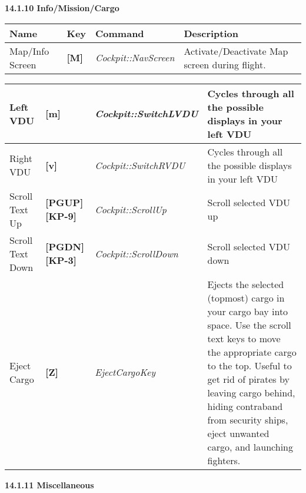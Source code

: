 \documentclass{article}
\begin{document}
\textbf{}

\textbf{}

\textbf{}

\textbf{}

\textbf{}

\textbf{}

\textbf{14.1.10 Info/Mission/Cargo }

\begin{tabular}{|p{0.8in}|p{0.4in}|p{1.1in}|p{2.5in}|} \hline 
\textbf{ Name } & \textbf{Key } & \textbf{ Command } & \textbf{Description } \\ \hline 
Map/Info Screen  & \textbf{[M] } & \textit{Cockpit::NavScreen } & Activate/Deactivate Map screen during flight.  \\ \hline 
\end{tabular}



\begin{tabular}{|p{0.7in}|p{0.5in}|p{1.1in}|p{2.5in}|} \hline 
Left VDU  & \textbf{[m] } & \textit{Cockpit::SwitchLVDU } & Cycles through all the possible displays in your left VDU  \\ \hline 
Right VDU  & \textbf{[v] } & \textit{Cockpit::SwitchRVDU } & Cycles through all the possible displays in your left VDU  \\ \hline 
Scroll Text Up  & \textbf{[PGUP] [KP-9] } & \textit{Cockpit::ScrollUp } & Scroll selected VDU up  \\ \hline 
Scroll Text Down  & \textbf{[PGDN] [KP-3] } & \textit{Cockpit::ScrollDown } & Scroll selected VDU down  \\ \hline 
Eject Cargo  & \textbf{[Z] } & \textit{EjectCargoKey } & Ejects the selected (topmost) cargo in your cargo bay into space. Use the scroll text keys to move the appropriate cargo to the top. Useful to get rid of pirates by leaving cargo behind, hiding contraband from security ships, eject unwanted cargo, and launching fighters.  \\ \hline 
\end{tabular}





\textbf{14.1.11 Miscellaneous}
\end{document}
